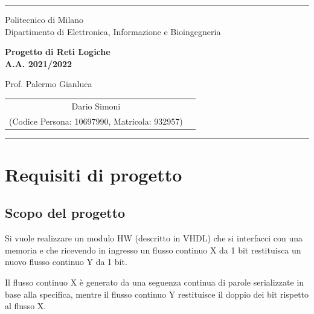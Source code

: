 \documentclass{article}
\begin{document}
\setlength\parindent{0pt} %
\setlength\parskip{1em}

\begin{titlepage}
    \centering
    \hrule

    \vspace{0,5cm}
    {
        \normalsize Politecnico di Milano\\
        Dipartimento di Elettronica, Informazione e Bioingegneria
    }

    \vspace{5cm}
    {\Huge \textbf{Progetto di Reti Logiche\\
            A.A. 2021/2022}\\}

    \vspace{0,5cm}
    \large {Prof. Palermo Gianluca}

    \vspace{5cm}
    {
        \large
        \begin{tabular}{c c}
            Dario Simoni \\
            (Codice Persona: 10697990, Matricola: 932957) \\
        \end{tabular}

    }

    \vspace{6.5cm}


    \hrule

\end{titlepage}

\pagebreak

\tableofcontents

\pagebreak

\section{Requisiti di progetto} %
\subsection{Scopo del progetto} %
Si vuole realizzare un modulo HW (descritto in VHDL) che si interfacci con una memoria e che
ricevendo in ingresso un flusso continuo X da 1 bit restituisca un nuovo flusso continuo Y da 1 bit.
\par
Il flusso continuo X è generato da una seguenza continua di parole serializzate in base alla specifica, mentre il flusso continuo Y restituisce il doppio dei bit rispetto al flusso X.
\vspace{0,2cm} %
\end{document}
